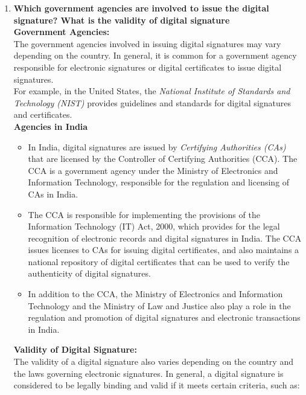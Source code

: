 \documentclass[11pt]{article}
\begin{document}
\begin{enumerate}
    \item \textbf{Which government agencies are involved to issue the digital signature? What is the validity of digital signature}\\


          \textbf{Government Agencies:}\\

          The government agencies involved in issuing digital signatures may vary depending on the country. In general, it is common for a government agency responsible for electronic signatures or digital certificates to issue digital signatures. \\

          For example, in the United States, the \textit{National Institute of Standards and Technology (NIST)} provides guidelines and standards for digital signatures and certificates.\\
    

          \textbf{Agencies in India}
          \begin{itemize}
              \item In India, digital signatures are issued by \textit{Certifying Authorities (CAs)} that are licensed by the Controller of Certifying Authorities (CCA). The CCA is a government agency under the Ministry of Electronics and Information Technology, responsible for the regulation and licensing of CAs in India. \\

              \item    The CCA is responsible for implementing the provisions of the Information Technology (IT) Act, 2000, which provides for the legal recognition of electronic records and digital signatures in India. The CCA issues licenses to CAs for issuing digital certificates, and also maintains a national repository of digital certificates that can be used to verify the authenticity of digital signatures.

              \item In addition to the CCA, the Ministry of Electronics and Information Technology and the Ministry of Law and Justice also play a role in the regulation and promotion of digital signatures and electronic transactions in India.

          \end{itemize}
          \textbf{Validity of Digital Signature:}\\

          The validity of a digital signature also varies depending on the country and the laws governing electronic signatures. In general, a digital signature is considered to be legally binding and valid if it meets certain criteria, such as:
          \begin{enumerate}


\end{enumerate}
\end{enumerate}
\end{document}
